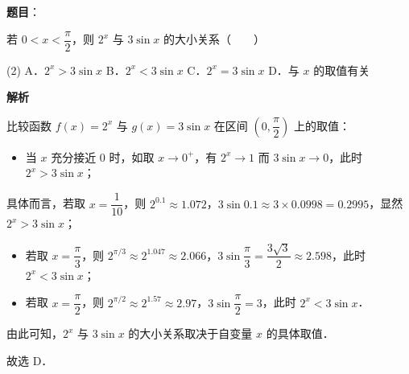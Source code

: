 \begin{answer}

\textbf{题目}：

若 $0 < x < \dfrac{\pi}{2}$，则 $2^x$ 与 $3\sin x$ 的大小关系\mbox{（　　）}

\begin{gkopts}(2)
\task A．$2^x > 3\sin x$
\task B．$2^x < 3\sin x$
\task C．$2^x = 3\sin x$
\task D．与 $x$ 的取值有关
\end{gkopts}

\textbf{解析}

比较函数 $f(x) = 2^x$ 与 $g(x) = 3\sin x$ 在区间 $\left(0, \dfrac{\pi}{2}\right)$ 上的取值：
\begin{itemize}
\item 当 $x$ 充分接近 0 时，如取 $x \to 0^+$，有 $2^x \to 1$ 而 $3\sin x \to 0$，此时 $2^x > 3\sin x$；
\end{itemize}
  具体而言，若取 $x = \dfrac{1}{10}$，则 $2^{0.1} \approx 1.072$，$3\sin 0.1 \approx 3 \times 0.0998 = 0.2995$，显然 $2^x > 3\sin x$；
\begin{itemize}
\item 若取 $x = \dfrac{\pi}{3}$，则 $2^{\pi/3} \approx 2^{1.047} \approx 2.066$，$3\sin\dfrac{\pi}{3} = \dfrac{3\sqrt{3}}{2} \approx 2.598$，此时 $2^x < 3\sin x$；
\item 若取 $x = \dfrac{\pi}{2}$，则 $2^{\pi/2} \approx 2^{1.57} \approx 2.97$，$3\sin\dfrac{\pi}{2} = 3$，此时 $2^x < 3\sin x$．
\end{itemize}

由此可知，$2^x$ 与 $3\sin x$ 的大小关系取决于自变量 $x$ 的具体取值．

故选 D．


\end{answer}
